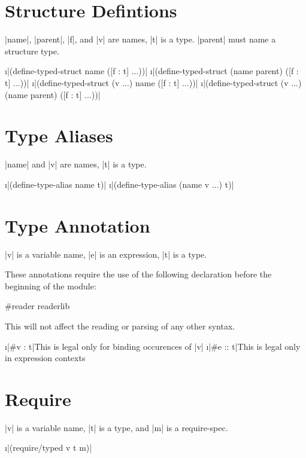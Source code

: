 \documentclass{book}
\begin{document}
\begin{schemeregion}
\section{Structure Defintions}

\scheme|name|, \scheme|parent|, \scheme|f|, and \scheme|v| are names,
\scheme|t| is a type.  \scheme|parent| must name a structure type.

\begin{itemize}
  \i{\scheme|(define-typed-struct name ([f : t] ...))|}{}
  \i{\scheme|(define-typed-struct (name parent) ([f : t] ...))|}{}
  \i{\scheme|(define-typed-struct (v ...) name ([f : t] ...))|}{}
  \i{\scheme|(define-typed-struct (v ...) (name parent) ([f : t] ...))|}{}
\end{itemize}

\section{Type Aliases}

\scheme|name| and \scheme|v| are names, \scheme|t| is a type.

\begin{itemize}
  \i{\scheme|(define-type-alias name t)|}{}
  \i{\scheme|(define-type-alias (name v ...) t)|}{}
\end{itemize}

\section{Type Annotation}

\scheme|v| is a variable name, \scheme|e| is an expression, \scheme|t| is a type.

These annotations require the use of the following declaration before
the beginning of the module:

\begin{schemedisplay}
#reader readerlib
\end{schemedisplay}

This will not affect the reading or parsing of any other syntax.

\begin{itemize}
  \i{\scheme|#{v : t}|}{This is legal only for binding occurences of \scheme|v|}
  \i{\scheme|#{e :: t}|}{This is legal only in expression contexts}
\end{itemize}

\section{Require}

\scheme|v| is a variable name, \scheme|t| is a type, and \scheme|m| is
a require-spec.

\begin{itemize}
        \i{\scheme|(require/typed v t m)|}{}
\end{itemize}

\end{schemeregion}
\end{document}
